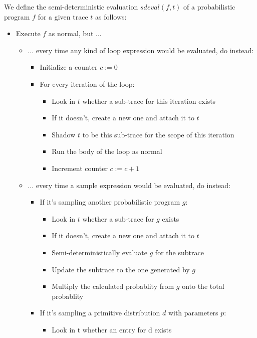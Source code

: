 We define the semi-deterministic evaluation $sdeval(f,t)$ of a probabilistic program $f$ for a given trace $t$ as follows:

\begin{minipage}{\linewidth}
\begin{itemize}
\item Execute $f$ as normal, but ...
  \begin{itemize}
  \item ... every time any kind of loop expression would be evaluated, do instead:
    \begin{itemize}
    \item Initialize a counter $c := 0$
    \item For every iteration of the loop:
      \begin{itemize}
      \item Look in $t$ whether a sub-trace for this iteration exists
      \item If it doesn't, create a new one and attach it to $t$
      \item Shadow $t$ to be this sub-trace for the scope of this iteration
      \item Run the body of the loop as normal
      \item Increment counter $c := c + 1$
      \end{itemize}
    \end{itemize}
  \item ... every time a sample expression would be evaluated, do instead:
    \begin{itemize}
    \item If it's sampling another probabilistic program $g$:
      \begin{itemize}
      \item Look in $t$ whether a sub-trace for $g$ exists
      \item If it doesn't, create a new one and attach it to $t$
      \item Semi-deterministically evaluate $g$ for the subtrace
      \item Update the subtrace to the one generated by $g$
      \item Multiply the calculated probablity from $g$ onto the total probablity
      \end{itemize}
    \item If it's sampling a primitive distribution $d$ with parameters $p$:
      \begin{itemize}
      \item Look in t whether an entry for d exists

\end{itemize}
\end{itemize}
\end{itemize}
\end{itemize}
\end{minipage}
